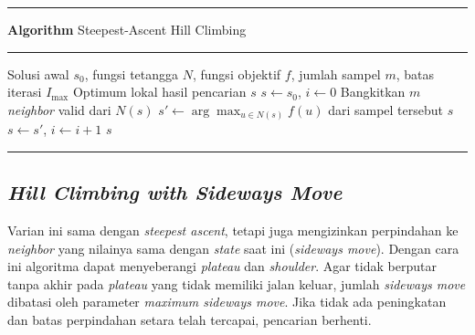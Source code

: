 \begingroup
\setlength{\parskip}{0pt}
\begin{list}{}{\setlength{\leftmargin}{0.1\linewidth}\setlength{\rightmargin}{0.1\linewidth}\setlength{\labelsep}{0pt}\setlength{\topsep}{0pt}\setlength{\partopsep}{0pt}\setlength{\parsep}{0pt}\setlength{\itemsep}{0pt}}\item[]
\noindent\rule{\linewidth}{0.8pt}\par\vspace{1pt}
\noindent{}\textbf{Algorithm \thealgorithm} Steepest-Ascent Hill Climbing\label{alg:steepest-ascent-hill-climbing}\par
\vspace{1pt}\noindent\rule{\linewidth}{0.4pt}\par\vspace{1pt}
\begin{algorithmic}
    \REQUIRE Solusi awal $s_0$, fungsi tetangga $N$, fungsi objektif $f$, jumlah sampel $m$, batas iterasi $I_{\max}$
    \ENSURE Optimum lokal hasil pencarian $s$
    \STATE $s \gets s_0$, $i \gets 0$
    \STATE Bangkitkan $m$ \textit{neighbor} valid dari $N(s)$
    \STATE $s' \gets \arg\max_{u \in N(s)} f(u)$ dari sampel tersebut
    \RETURN $s$
    \ENDIF
    \STATE $s \gets s'$, $i \gets i+1$
    \ENDWHILE
    \RETURN $s$
\end{algorithmic}
\par\vspace{1pt}\noindent\rule{\linewidth}{0.8pt}
\end{list}
\endgroup

\subsection{\textit{Hill Climbing with Sideways Move}}
Varian ini sama dengan \textit{steepest ascent}, tetapi juga mengizinkan perpindahan ke \textit{neighbor} yang nilainya sama dengan \textit{state} saat ini (\textit{sideways move}). Dengan cara ini algoritma dapat menyeberangi \textit{plateau} dan \textit{shoulder}. Agar tidak berputar tanpa akhir pada \textit{plateau} yang tidak memiliki jalan keluar, jumlah \textit{sideways move} dibatasi oleh parameter \textit{maximum sideways move}. Jika tidak ada peningkatan dan batas perpindahan setara telah tercapai, pencarian berhenti.

